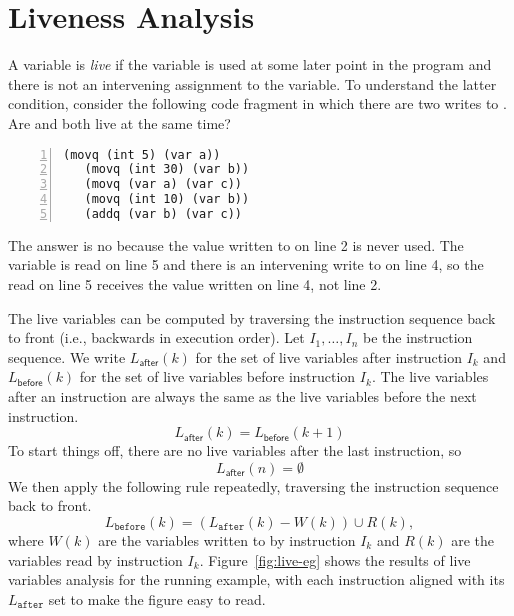 \documentclass[11pt]{book}
\begin{document}
\section{Liveness Analysis}
\label{sec:liveness-analysis}

A variable is \emph{live} if the variable is used at some later point
in the program and there is not an intervening assignment to the
variable.
%
To understand the latter condition, consider the following code
fragment in which there are two writes to . Are  and
 both live at the same time?
\begin{lstlisting}[numbers=left,numberstyle=\tiny]
   (movq (int 5) (var a))
   (movq (int 30) (var b))
   (movq (var a) (var c))
   (movq (int 10) (var b))
   (addq (var b) (var c))
\end{lstlisting}
The answer is no because the value  written to  on
line 2 is never used. The variable  is read on line 5 and
there is an intervening write to  on line 4, so the read on
line 5 receives the value written on line 4, not line 2.

The live variables can be computed by traversing the instruction
sequence back to front (i.e., backwards in execution order).  Let
$I_1,\ldots, I_n$ be the instruction sequence. We write
$L_{\mathsf{after}}(k)$ for the set of live variables after
instruction $I_k$ and $L_{\mathsf{before}}(k)$ for the set of live
variables before instruction $I_k$. The live variables after an
instruction are always the same as the live variables before the next
instruction.
\begin{equation*}
  L_{\mathsf{after}}(k) = L_{\mathsf{before}}(k+1)
\end{equation*}
To start things off, there are no live variables after the last
instruction, so 
\begin{equation*}
  L_{\mathsf{after}}(n) = \emptyset 
\end{equation*}
We then apply the following rule repeatedly, traversing the
instruction sequence back to front.
\begin{equation*}
  L_{\mathtt{before}}(k) = (L_{\mathtt{after}}(k) - W(k)) \cup R(k),
\end{equation*}
where $W(k)$ are the variables written to by instruction $I_k$ and
$R(k)$ are the variables read by instruction $I_k$.
Figure~\ref{fig:live-eg} shows the results of live variables analysis
for the running example, with each instruction aligned with its
$L_{\mathtt{after}}$ set to make the figure easy to read.
\end{document}
